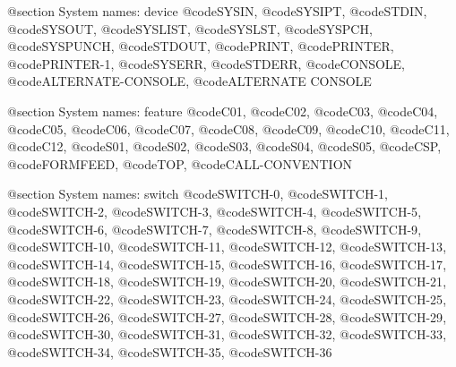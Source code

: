 @section System names: device
@code{SYSIN}, @code{SYSIPT}, @code{STDIN}, @code{SYSOUT}, @code{SYSLIST}, @code{SYSLST}, @code{SYSPCH}, @code{SYSPUNCH}, @code{STDOUT}, @code{PRINT}, @code{PRINTER}, @code{PRINTER-1}, @code{SYSERR}, @code{STDERR}, @code{CONSOLE}, @code{ALTERNATE-CONSOLE}, @code{ALTERNATE CONSOLE}

@section System names: feature
@code{C01}, @code{C02}, @code{C03}, @code{C04}, @code{C05}, @code{C06}, @code{C07}, @code{C08}, @code{C09}, @code{C10}, @code{C11}, @code{C12}, @code{S01}, @code{S02}, @code{S03}, @code{S04}, @code{S05}, @code{CSP}, @code{FORMFEED}, @code{TOP}, @code{CALL-CONVENTION}

@section System names: switch
@code{SWITCH-0}, @code{SWITCH-1}, @code{SWITCH-2}, @code{SWITCH-3}, @code{SWITCH-4}, @code{SWITCH-5}, @code{SWITCH-6}, @code{SWITCH-7}, @code{SWITCH-8}, @code{SWITCH-9}, @code{SWITCH-10}, @code{SWITCH-11}, @code{SWITCH-12}, @code{SWITCH-13}, @code{SWITCH-14}, @code{SWITCH-15}, @code{SWITCH-16}, @code{SWITCH-17}, @code{SWITCH-18}, @code{SWITCH-19}, @code{SWITCH-20}, @code{SWITCH-21}, @code{SWITCH-22}, @code{SWITCH-23}, @code{SWITCH-24}, @code{SWITCH-25}, @code{SWITCH-26}, @code{SWITCH-27}, @code{SWITCH-28}, @code{SWITCH-29}, @code{SWITCH-30}, @code{SWITCH-31}, @code{SWITCH-32}, @code{SWITCH-33}, @code{SWITCH-34}, @code{SWITCH-35}, @code{SWITCH-36}

